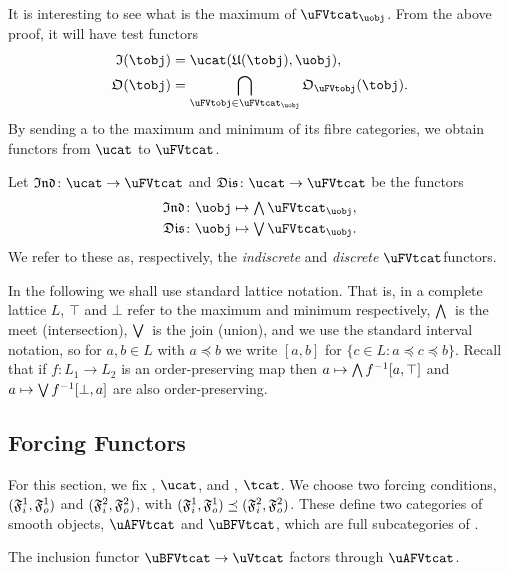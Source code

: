 \documentclass[%
a4paper,%
arxiv,%
defaults
]{myclass}
\begin{document}
It is interesting to see what is the maximum of \(\uFVtcat_{\uobj}\).
From the above proof, it will have test functors
%
\begin{align*}
\itest(\tobj) &= \Hom{\ucat}{\ufunc(\tobj)}{\uobj}, \\
%
\otest(\tobj) &= \bigcap_{\uFVtobj \in \uFVtcat_{\uobj}} \otest_{\uFVtobj}(\tobj).
\end{align*}
%
By sending a \uobj to the maximum and minimum of its fibre categories, we obtain functors from \(\ucat\) to \(\uFVtcat\).

\begin{defn}
Let \(\indfunc \colon \ucat \to \uFVtcat\) and \(\disfunc \colon \ucat \to \uFVtcat\) be the functors
%
\begin{align*}
\indfunc \colon \uobj &\mapsto \meet \uFVtcat_{\uobj}, \\
%
\disfunc \colon \uobj &\mapsto \join \uFVtcat_{\uobj}.
\end{align*}
%
We refer to these as, respectively, the \emph{indiscrete} and \emph{discrete} \(\uFVtcat\)\enhyp{}functors.
\end{defn}


In the following we shall use standard lattice notation.
That is, in a complete lattice \(L\), \(\top\) and \(\bot\) refer to the maximum and minimum respectively, \({\textstyle\bigwedge}\,\) is the meet (intersection), \({\textstyle\bigvee}\,\) is the join (union), and we use the standard interval notation, so for \(a, b \in L\) with \(a \preceq b\) we  write \([a,b]\) for \(\{c \in L : a \preceq c \preceq b\}\).
Recall that if \(f \colon L_1 \to L_2\) is an order\hyp{}preserving map then \(a \mapsto {\textstyle\bigwedge}\, f^{-1}[a, \top]\) and \(a \mapsto {\textstyle\bigvee}\, f^{-1}[\bot, a]\) are also order\hyp{}preserving. 

\subsection{Forcing Functors}
\label{sec:force}

For this section, we fix \ucat, \(\ucat\), and \tcat, \(\tcat\).
We choose two forcing conditions, \((\iforce^1, \oforce^1)\) and \((\iforce^2, \oforce^2)\), with \((\iforce^1, \oforce^1) \preceq (\iforce^2, \oforce^2)\).
These define two categories of smooth objects, \(\uAFVtcat\) and \(\uBFVtcat\), which are full subcategories of \uVtcat.

\begin{proposition}
The inclusion functor \(\uBFVtcat \to \uVtcat\) factors through \(\uAFVtcat\).
\end{proposition}
\end{document}
